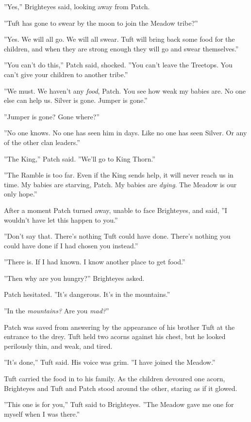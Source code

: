 \documentclass[12pt]{book}
\begin{document}
''Yes,'' Brighteyes said, looking away from Patch.

''Tuft has gone to swear by the moon to join the Meadow tribe?''

''Yes. We will all go. We will all swear. Tuft will bring back some food for the children, and when they are strong enough they will go and swear themselves.''

''You can't do this,'' Patch said, shocked. ''You can't leave the Treetops. You can't give your children to another tribe.''

''We must. We haven't any {\it food}, Patch. You see how weak my babies are. No one else can help us. Silver is gone. Jumper is gone.''

''Jumper is gone? Gone where?''

''No one knows. No one has seen him in days. Like no one has seen Silver. Or any of the other clan leaders.''

''The King,'' Patch said. ''We'll go to King Thorn.''

''The Ramble is too far. Even if the King sends help, it will never reach us in time. My babies are starving, Patch. My babies are {\it dying}. The Meadow is our only hope.''

After a moment Patch turned away, unable to face Brighteyes, and said, ''I wouldn't have let this happen to you.''

''Don't say that. There's nothing Tuft could have done. There's nothing you could have done if I had chosen you instead.''

''There is. If I had known. I know another place to get food.''

''Then why are you hungry?'' Brighteyes asked.

Patch hesitated. ''It's dangerous. It's in the mountains.''

''In the {\it mountains?} Are you {\it mad?}''

Patch was saved from answering by the appearance of his brother Tuft at the entrance to the drey. Tuft held two acorns against his chest, but he looked perilously thin, and weak, and tired.

''It's done,'' Tuft said. His voice was grim. ''I have joined the Meadow.''

Tuft carried the food in to his family. As the children devoured one acorn, Brighteyes and Tuft and Patch stood around the other, staring as if it glowed.

''This one is for you,'' Tuft said to Brighteyes. ''The Meadow gave me one for myself when I was there.''
\end{document}
